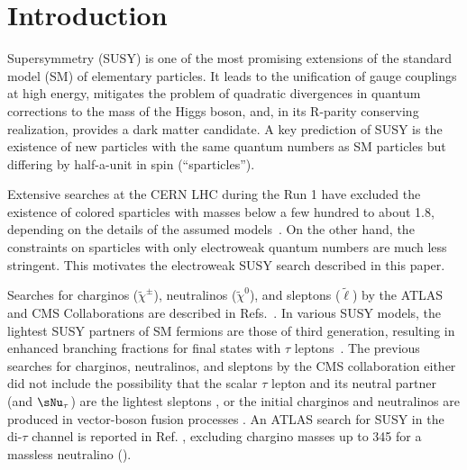 \section{Introduction}
\label{sect:introduction}

Supersymmetry (SUSY) \cite{Golfand:1971iw,Wess:1973kz,Wess:1974tw,Fayet1,Fayet2} is one of the most promising extensions of the 
standard model (SM) of elementary particles.  It leads to the unification of gauge couplings at
high energy, mitigates the problem of quadratic divergences in quantum corrections to the
mass of the Higgs boson, and, in its R-parity conserving realization, provides a dark matter candidate.
A key prediction of SUSY is the existence of new particles with the same quantum numbers as SM particles but
differing by half-a-unit in spin (``sparticles'').

Extensive searches at the CERN LHC during the Run 1 have excluded the existence of colored sparticles with masses below a few hundred \GeV to about 1.8\TeV,
depending on the details of the assumed models~\cite{%
Chatrchyan:2013fea,Chatrchyan:2013mys,Chatrchyan:2014aea,Chatrchyan:2014lfa,%
Khachatryan:2015vra,Khachatryan:2015lwa,Aad:2015pfx,Aad:2015iea}. %
On the other hand, the constraints on sparticles with only electroweak quantum numbers are much less stringent.  This motivates the electroweak SUSY search 
described in this paper.


Searches for charginos ($\widetilde{\chi}^{\pm}\xspace$), neutralinos ($\widetilde{\chi}^{0}\xspace$), and sleptons ($\widetilde{\ell}\xspace$) by the ATLAS and CMS Collaborations are described in Refs.~\cite{Aad:2014nua,Aad:2014vma,Khachatryan:2014qwa,Khachatryan:2014mma,Khachatryan:2015kxa}.
In various SUSY models, the lightest SUSY partners of SM fermions are those of third generation, 
resulting in enhanced branching fractions for final states with $\tau$ leptons~\cite{Martin:1997ns}.  
The previous searches for charginos, neutralinos,
and sleptons by the CMS collaboration  
 either did not include the possibility that 
the scalar $\tau$ lepton and its neutral partner (\stau and $\sNu_\tau$) 
are the lightest sleptons \cite{Khachatryan:2014qwa}, or the initial charginos and neutralinos are produced in vector-boson fusion processes \cite{Khachatryan:2015kxa}. An ATLAS search for SUSY in the di-$\tau$ channel is reported in Ref. \cite{Aad:2014yka}, excluding chargino masses up to 345 \GeV 
for a massless neutralino (\PSGczDo).


